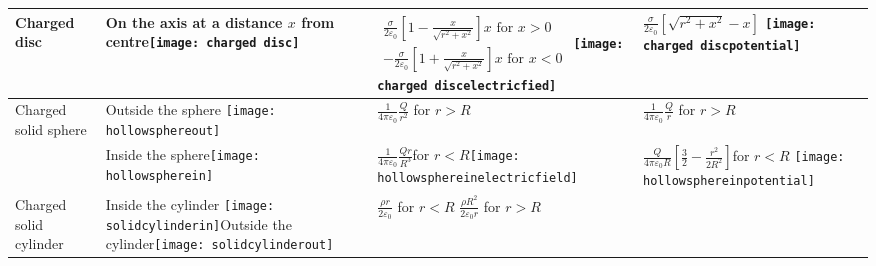 \begin{table}[H]
\begin{tabular}{|p{3.5cm}|p{3.8cm}|p{4.6cm}|p{4.2cm}|}
		Charged disc& On the axis at  a distance $x$ from centre\newline\newline \texttt{[image: charged disc]} &$
		\begin{array}{l}
		\frac{\sigma}{2 \varepsilon_{0}}\left[1-\frac{x}{\sqrt{r^{2}+x^{2}}}\right] x \text { for } x>0 \\
		-\frac{\sigma}{2 \varepsilon_{0}}\left[1+\frac{x}{\sqrt{r^{2}+x^{2}}}\right] x \text { for } x<0
		\end{array}
		$ \newline\newline \texttt{[image: charged discelectricfied]}  &$\frac{\sigma}{2 \varepsilon_{0}}\left[\sqrt{r^{2}+x^{2}}-x\right]$ \newline\newline \texttt{[image: charged discpotential]} \\\hline
		
		
		\multirow{2}{*}{	Charged solid sphere}& Outside the sphere
		\newline \texttt{[image: hollowsphereout]}
		&$\frac{1}{4 \pi \varepsilon_{0}} \frac{Q}{r^{2}}$ for $r>R$&$\frac{1}{4 \pi \varepsilon_{0}} \frac{Q}{r} $ for $r>R$\\
		&Inside the sphere\newline \newline \texttt{[image: hollowspherein]}   & $\frac{1}{4 \pi \varepsilon_{0}} \frac{Qr}{R^{3}}$for $r<R$\newline \newline \texttt{[image: hollowsphereinelectricfield]}   &$\frac{Q}{4 \pi \varepsilon_{0} R}\left[\frac{3}{2}-\frac{r^{2}}{2 R^{2}}\right]$for $r<R$ \newline\newline \texttt{[image: hollowsphereinpotential]} \\\hline
		
		\multirow{2}{*}{Charged solid cylinder}& Inside the cylinder
		\newline \texttt{[image: solidcylinderin]}\newline Outside the cylinder\newline \newline \texttt{[image: solidcylinderout]} 
		&$\frac{\rho r}{2 \varepsilon_{0}}$ for $r<R$  \newline \newline $\frac{\rho R^{2}}{2 \varepsilon_{0}r}$ for $r>R$\newline \newline
		

\end{tabular}
\end{table}
